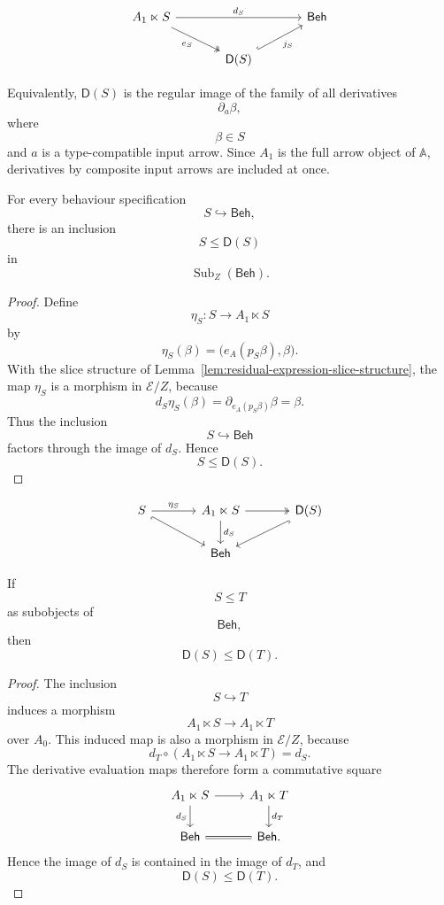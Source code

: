 \[
\begin{tikzcd}[column sep=large]
A_1\ltimes S
\arrow[rr, "d_S"]
\arrow[dr, two heads, "e_S"']
&&
\mathsf{Beh}
\\
&
\mathsf D(S)
\arrow[ur, hook, "j_S"']
&
\end{tikzcd}
\]

Equivalently, \(\mathsf D(S)\) is the regular image of the family of all
derivatives
\[
\partial_a\beta,
\]
where
\[
\beta\in S
\]
and \(a\) is a type-compatible input arrow. Since \(A_1\) is the full arrow
object of \(\mathbb A\), derivatives by composite input arrows are included
at once.

\begin{proposition}[Extensivity]
\label{prop:residual-closure-extensive}
For every behaviour specification
\[
S\hookrightarrow\mathsf{Beh},
\]
there is an inclusion
\[
S\leq \mathsf D(S)
\]
in
\[
\operatorname{Sub}_Z(\mathsf{Beh}).
\]
\end{proposition}

\begin{proof}
Define
\[
\eta_S:S\to A_1\ltimes S
\]
by
\[
\eta_S(\beta)=\bigl(e_A(p_S\beta),\beta\bigr).
\]
With the slice structure of
Lemma~\ref{lem:residual-expression-slice-structure}, the map \(\eta_S\) is a
morphism in \(\mathcal E/Z\), because
\[
d_S\eta_S(\beta)
=
\partial_{e_A(p_S\beta)}\beta
=
\beta.
\]
Thus the inclusion
\[
S\hookrightarrow\mathsf{Beh}
\]
factors through the image of \(d_S\). Hence
\[
S\leq \mathsf D(S).
\]
\end{proof}

\[
\begin{tikzcd}[column sep=large]
S
\arrow[r, "\eta_S"]
\arrow[dr, hook']
&
A_1\ltimes S
\arrow[d, "d_S"]
\arrow[r, two heads]
&
\mathsf D(S)
\arrow[dl, hook]
\\
&
\mathsf{Beh}
&
\end{tikzcd}
\]

\begin{proposition}[Monotonicity]
\label{prop:residual-closure-monotone}
If
\[
S\leq T
\]
as subobjects of
\[
\mathsf{Beh},
\]
then
\[
\mathsf D(S)\leq \mathsf D(T).
\]
\end{proposition}

\begin{proof}
The inclusion
\[
S\hookrightarrow T
\]
induces a morphism
\[
A_1\ltimes S\to A_1\ltimes T
\]
over \(A_0\). This induced map is also a morphism in \(\mathcal E/Z\), because
\[
d_T\circ(A_1\ltimes S\to A_1\ltimes T)=d_S.
\]
The derivative evaluation maps therefore form a commutative square
\[
\begin{tikzcd}
A_1\ltimes S
\arrow[r]
\arrow[d, "d_S"']
&
A_1\ltimes T
\arrow[d, "d_T"]
\\
\mathsf{Beh}
\arrow[r, equal]
&
\mathsf{Beh}.
\end{tikzcd}
\]
Hence the image of \(d_S\) is contained in the image of \(d_T\), and
\[
\mathsf D(S)\leq \mathsf D(T).
\]
\end{proof}

